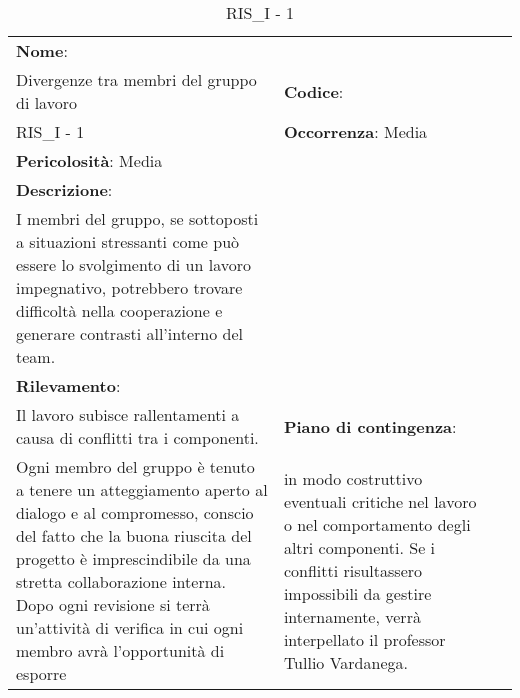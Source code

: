 \renewcommand{\arraystretch}{1.5}
\begin{longtable} { 
		>{\raggedright}p{} 
		>{\raggedright}p{} 
		>{\raggedright}p{}    }
	
	\caption{RIS\_I - 1} \endhead	
	
	
	\textbf{Nome}: \\ Divergenze tra membri del gruppo di lavoro
	& \textbf{Codice}: \\ RIS\_I - 1
	& \textbf{Occorrenza}: Media \\ \textbf{Pericolosità}: Media
	
	\tabularnewline
	
	\textbf{Descrizione}: \\ I membri del gruppo, se sottoposti a situazioni stressanti come può essere lo svolgimento di un lavoro impegnativo, potrebbero trovare difficoltà nella cooperazione e generare contrasti all'interno del team.
	\\
	
	\textbf{Rilevamento}: \\ Il lavoro subisce rallentamenti a causa di conflitti tra i componenti.
	& 
	\textbf{Piano di contingenza}: \\ Ogni membro del gruppo è tenuto a tenere un atteggiamento aperto al dialogo e al compromesso, conscio del fatto che la buona riuscita del progetto è imprescindibile da una stretta collaborazione interna. Dopo ogni revisione si terrà un'attività di verifica in cui ogni membro avrà l'opportunità di esporre 
	&  
	in modo costruttivo eventuali critiche nel lavoro o nel comportamento degli altri componenti. Se i conflitti risultassero impossibili da gestire internamente, verrà interpellato il professor Tullio Vardanega.
	
\end{longtable}











